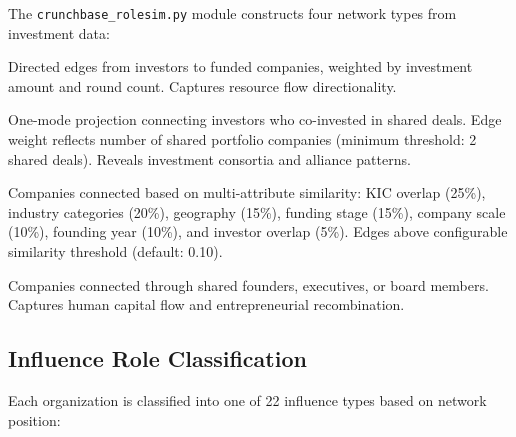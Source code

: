 \documentclass[../main.tex]{subfiles}
\begin{document}
The \texttt{crunchbase\_rolesim.py} module constructs four network types
from investment data:

\begin{description}[leftmargin=0.5cm, itemsep=0.3em]
\item[Investor-Company Bipartite.]
Directed edges from investors to funded companies,
weighted by investment amount and round count.
Captures resource flow directionality.

\item[Co-Investor Network.]
One-mode projection connecting investors who co-invested in shared deals.
Edge weight reflects number of shared portfolio companies
(minimum threshold: 2 shared deals).
Reveals investment consortia and alliance patterns.

\item[Company Similarity Network.]
Companies connected based on multi-attribute similarity:
KIC overlap (25\%), industry categories (20\%), geography (15\%),
funding stage (15\%), company scale (10\%), founding year (10\%),
and investor overlap (5\%).
Edges above configurable similarity threshold (default: 0.10).

\item[Founder Mobility Network.]
Companies connected through shared founders, executives, or board members.
Captures human capital flow and entrepreneurial recombination.
\end{description}

\subsection{Influence Role Classification}

Each organization is classified into one of 22 influence types
based on network position:
\end{document}
